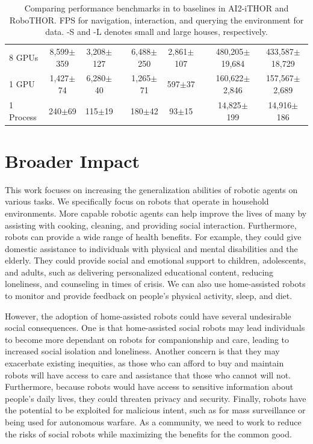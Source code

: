 \begin{table}
{\begin{tabular}{l cc c cc c cc}
        8 GPUs & 8,599{\scriptsize$\pm$359} & 3,208{\scriptsize$\pm$127} && 6,488{\scriptsize$\pm$250} & 2,861{\scriptsize$\pm$107} && 480,205{\scriptsize$\pm$19,684} & 433,587{\scriptsize$\pm$18,729} \\
        1 GPU & 1,427{\scriptsize$\pm$74} & 6,280{\scriptsize$\pm$40} && 1,265{\scriptsize$\pm$71}  & 597{\scriptsize$\pm$37} && 160,622{\scriptsize$\pm$2,846} & 157,567{\scriptsize$\pm$2,689}\\
        1 Process & 240{\scriptsize$\pm$69} & 115{\scriptsize$\pm$19} && 180{\scriptsize$\pm$42} & 93{\scriptsize$\pm$15} &&
        14,825{\scriptsize$\pm$199} & 14,916{\scriptsize$\pm$186}\\
        \bottomrule
    \end{tabular}%
    }
    \vspace{0.05in}
    \caption{Comparing performance benchmarks in \env{} to baselines in AI2-iTHOR and RoboTHOR. FPS for navigation, interaction, and querying the environment for data. \env{}-S and \env{}-L denotes small and large \env{} houses, respectively.}
    \label{tab:baseFps}
    \vspace{-0.2in}
\end{table}


\section{Broader Impact}

This work focuses on increasing the generalization abilities of robotic agents on various tasks. We specifically focus on robots that operate in household environments. More capable robotic agents can help improve the lives of many by assisting with cooking, cleaning, and providing social interaction. Furthermore, robots can provide a wide range of health benefits. For example, they could give domestic assistance to individuals with physical and mental disabilities and the elderly. They could provide social and emotional support to children, adolescents, and adults, such as delivering personalized educational content, reducing loneliness, and counseling in times of crisis. We can also use home-assisted robots to monitor and provide feedback on people's physical activity, sleep, and diet.

However, the adoption of home-assisted robots could have several undesirable social consequences. One is that home-assisted social robots may lead individuals to become more dependant on robots for companionship and care, leading to increased social isolation and loneliness. Another concern is that they may exacerbate existing inequities, as those who can afford to buy and maintain robots will have access to care and assistance that those who cannot will not. Furthermore, because robots would have access to sensitive information about people's daily lives, they could threaten privacy and security. Finally, robots have the potential to be exploited for malicious intent, such as for mass surveillance or being used for autonomous warfare. As a community, we need to work to reduce the risks of social robots while maximizing the benefits for the common good.
